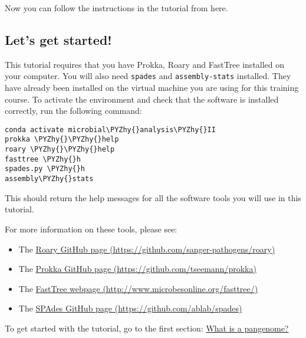 \documentclass[11pt]{article}
\makeatletter
\providecommand{\tightlist}{%
      \setlength{\itemsep}{0pt}\setlength{\parskip}{0pt}}
\def\PYZhy{\char`\-}
\newcommand{\boxspacing}{\kern\kvtcb@left@rule\kern\kvtcb@boxsep}
\newcommand{\prompt}[4]{
         {\ttfamily\llap{{\color{blue}\LARGE\faKeyboardO\hspace{3pt}#4}}\vspace{-\baselineskip}}
    }
\makeatother
\begin{document}
    Now you can follow the instructions in the tutorial from here.

\hypertarget{lets-get-started}{%
\subsection{Let's get started!}\label{lets-get-started}}

This tutorial requires that you have Prokka, Roary and FastTree
installed on your computer. You will also need \texttt{spades} and
\texttt{assembly-stats} installed. They have already been installed on
the virtual machine you are using for this training course. To activate
the environment and check that the software is installed correctly, run
the following command:

    \begin{tcolorbox}[breakable, size=fbox, boxrule=1pt, pad at break*=1mm,colback=cellbackground, colframe=cellborder]
\prompt{In}{incolor}{ }{\boxspacing}
\begin{Verbatim}[commandchars=\\\{\}]
conda activate microbial\PYZhy{}analysis\PYZhy{}II
prokka \PYZhy{}\PYZhy{}help
roary \PYZhy{}\PYZhy{}help
fasttree \PYZhy{}h
spades.py \PYZhy{}h
assembly\PYZhy{}stats
\end{Verbatim}
\end{tcolorbox}

    This should return the help messages for all the software tools you will
use in this tutorial.

    For more information on these tools, please see:

\begin{itemize}
\tightlist
\item
  The \href{https://github.com/sanger-pathogens/roary}{Roary GitHub page
  (https://github.com/sanger-pathogens/roary)}
\item
  The \href{https://github.com/tseemann/prokka}{Prokka GitHub page
  (https://github.com/tseemann/prokka)}
\item
  The \href{http://www.microbesonline.org/fasttree/}{FastTree webpage
  (http://www.microbesonline.org/fasttree/)}
\item
  The \href{https://github.com/ablab/spades}{SPAdes GitHub page
  (https://github.com/ablab/spades)}
\end{itemize}

    To get started with the tutorial, go to the first section:
\href{pan_genome.ipynb}{What is a pangenome?}
\end{document}
